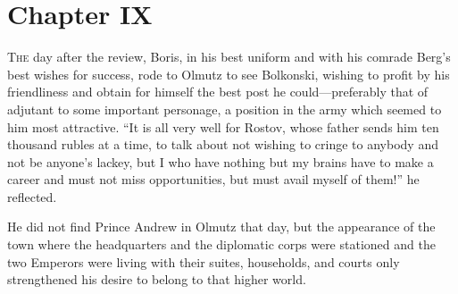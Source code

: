 
\chapter*{Chapter IX}
\ifaudio     
{} 
\fi

\lettrine[lines=2, loversize=0.3, lraise=0]{\initfamily T}{he}
 day after the review, Boris, in his best uniform and with his
comrade Berg's best wishes for success, rode to Olmutz to see
Bolkonski, wishing to profit by his friendliness and obtain for
himself the best post he could---preferably that of adjutant to
some important personage, a position in the army which seemed to
him most attractive. ``It is all very well for Rostov, whose
father sends him ten thousand rubles at a time, to talk about not
wishing to cringe to anybody and not be anyone's lackey, but I
who have nothing but my brains have to make a career and must not
miss opportunities, but must avail myself of them!'' he
reflected.

He did not find Prince Andrew in Olmutz that day, but the
appearance of the town where the headquarters and the diplomatic
corps were stationed and the two Emperors were living with their
suites, households, and courts only strengthened his desire to
belong to that higher world.

